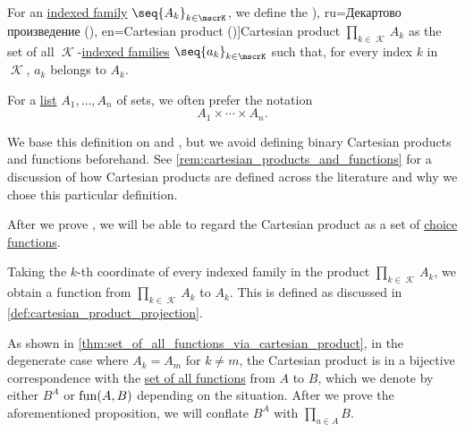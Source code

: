 \begin{definition}\label{def:cartesian_product}\mimprovised
  For an \hyperref[def:indexed_family]{indexed family} \( \seq{ A_k }_{k \in \mscrK} \), we define the \term[bg=Декартово произведение (\cite[367]{ГеновМиховскиМоллов1991Алгебра}), ru=Декартово произведение (\cite[11]{Архангельский1988КанторовскаяТеорияМножеств}), en=Cartesian product (\cite[36]{Halmos1960NaiveSetTheory})]{Cartesian product} \( \prod_{k \in \mscrK} A_k \) as the set of all \( \mscrK \)-\hyperref[def:indexed_family]{indexed families} \( \seq{ a_k }_{k \in \mscrK} \) such that, for every index \( k \) in \( \mscrK \), \( a_k \) belongs to \( A_k \).

  For a \hyperref[def:ordered_tuple]{list} \( A_1, \ldots, A_n \) of sets, we often prefer the notation
  \begin{equation*}
    A_1 \times \cdots \times A_n.
  \end{equation*}
\end{definition}
\begin{comments}
  \item We base this definition on \cite[36]{Halmos1960NaiveSetTheory} and \cite[11]{Архангельский1988КанторовскаяТеорияМножеств}, but we avoid defining binary Cartesian products and functions beforehand. See \cref{rem:cartesian_products_and_functions} for a discussion of how Cartesian products are defined across the literature and why we chose this particular definition.

  \item After we prove , we will be able to regard the Cartesian product as a set of \hyperref[def:choice_function]{choice functions}.

  \item Taking the \( k \)-th coordinate of every indexed family in the product \( \prod_{k \in \mscrK} A_k \), we obtain a function from \( \prod_{k \in \mscrK} A_k \) to \( A_k \). This is defined as discussed in \cref{def:cartesian_product_projection}.

  \item As shown in \cref{thm:set_of_all_functions_via_cartesian_product}, in the degenerate case where \( A_k = A_m \) for \( k \neq m \), the Cartesian product is in a bijective correspondence with the \hyperref[def:set_of_all_functions]{set of all functions} from \( A \) to \( B \), which we denote by either \( B^A \) or \( \operatorname{fun}(A, B) \) depending on the situation. After we prove the aforementioned proposition, we will conflate \( B^A \) with \( \prod_{a \in A} B \).
\end{comments}

